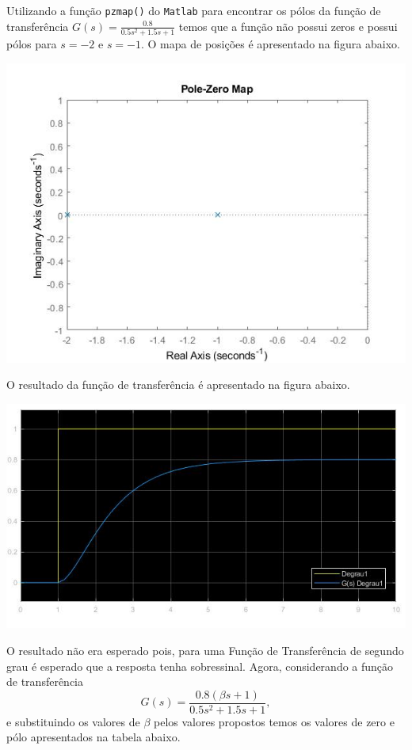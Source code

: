 \documentclass[
]{book}
\begin{document}
Utilizando a função \texttt{pzmap()} do \texttt{Matlab} para encontrar os pólos da função de transferência \(G(s) = \frac {0.8}{0.5s^2+1.5s+1}\) temos que a função não possui zeros e possui pólos para \(s = -2\) e \(s = -1\). O mapa de posições é apresentado na figura abaixo.

\includegraphics{Imagens/Lab2/prob4.jpg}

O resultado da função de transferência é apresentado na figura abaixo.

\includegraphics{imagens/Lab2/prob41.jpg}

O resultado não era esperado pois, para uma Função de Transferência de segundo grau é esperado que a resposta tenha sobressinal. Agora, considerando a função de transferência
\[
G(s) = \frac {0.8(\beta s+1)}{0.5s^2+1.5s+1},
\]
e substituindo os valores de \(\beta\) pelos valores propostos temos os valores de zero e pólo apresentados na tabela abaixo.
\end{document}
